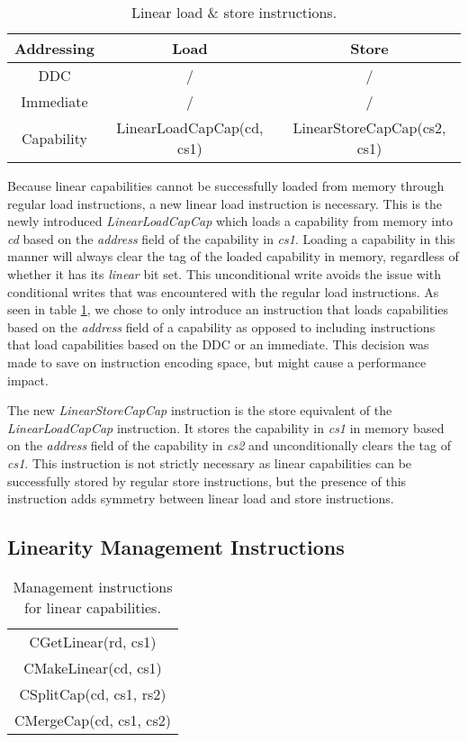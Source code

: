 \begin{table}[h]
\centering
\begin{tabular}{| c | c | c |}
\hline
 Addressing & Load & Store \\
 \hline
 DDC & / & / \\
 Immediate & / & / \\
 Capability & LinearLoadCapCap(cd, cs1) & LinearStoreCapCap(cs2, cs1) \\
\hline
\end{tabular}
\caption{Linear load \& store instructions.}
\label{table:linloadstoreinst}
\end{table}

Because linear capabilities cannot be successfully loaded from memory through regular load instructions, a new linear load instruction is necessary. This is the newly introduced \textit{LinearLoadCapCap} which loads a capability from memory into \textit{cd} based on the \textit{address} field of the capability in \textit{cs1}. Loading a capability in this manner will always clear the tag of the loaded capability in memory, regardless of whether it has its \textit{linear} bit set. This unconditional write avoids the issue with conditional writes that was encountered with the regular load instructions. As seen in table \ref{table:linloadstoreinst}, we chose to only introduce an instruction that loads capabilities based on the \textit{address} field of a capability as opposed to including instructions that load capabilities based on the DDC or an immediate. This decision was made to save on instruction encoding space, but might cause a performance impact.

The new \textit{LinearStoreCapCap} instruction is the store equivalent of the \textit{LinearLoadCapCap} instruction. It stores the capability in \textit{cs1} in memory based on the \textit{address} field of the capability in \textit{cs2} and unconditionally clears the tag of \textit{cs1}. This instruction is not strictly necessary as linear capabilities can be successfully stored by regular store instructions, but the presence of this instruction adds symmetry between linear load and store instructions.

\subsection{Linearity Management Instructions}
\label{sec:lininsts}
\begin{table}[h]
\centering
\begin{tabular}{| c |}
\hline
 CGetLinear(rd, cs1) \\
 CMakeLinear(cd, cs1) \\
 CSplitCap(cd, cs1, rs2) \\
 CMergeCap(cd, cs1, cs2) \\
\hline
\end{tabular}
\caption{Management instructions for linear capabilities.}
\label{table:lininstmanag}
\end{table}

